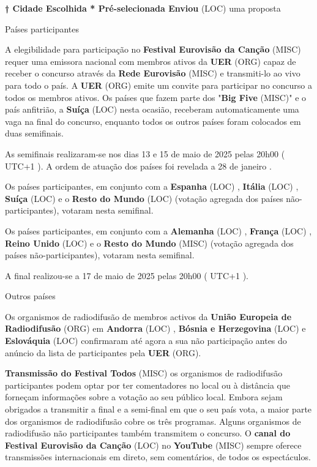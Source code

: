 \documentclass[12pt,a4paper]{article}
\begin{document}
\textbf{† Cidade Escolhida * Pré-selecionada  Enviou} (LOC) uma proposta



Países participantes

A elegibilidade para participação no \textbf{Festival Eurovisão da Canção} (MISC) requer uma emissora nacional com membros ativos da \textbf{UER} (ORG) capaz de receber o concurso através da \textbf{Rede Eurovisão} (MISC) e transmiti-lo ao vivo para todo o país. A \textbf{UER} (ORG) emite um convite para participar no concurso a todos os membros ativos. Os países que fazem parte dos "\textbf{Big Five} (MISC)" e o país anfitrião, a \textbf{Suíça} (LOC) nesta ocasião, receberam automaticamente uma vaga na final do concurso, enquanto todos os outros países foram colocados em duas semifinais.

As semifinais realizaram-se nos dias 13 e 15 de maio de 2025 pelas 20h00 ( UTC+1 ). A ordem de atuação dos países foi revelada a 28 de janeiro .

Os países participantes, em conjunto com a \textbf{Espanha} (LOC) , \textbf{Itália} (LOC) , \textbf{Suíça} (LOC) e o \textbf{Resto do Mundo} (LOC) (votação agregada dos países não-participantes), votaram nesta semifinal.

Os países participantes, em conjunto com a \textbf{Alemanha} (LOC) , \textbf{França} (LOC) , \textbf{Reino Unido} (LOC) e o \textbf{Resto do Mundo} (MISC) (votação agregada dos países não-participantes), votaram nesta semifinal.

A final realizou-se a 17 de maio de 2025 pelas 20h00 ( UTC+1 ).



Outros países

Os organismos de radiodifusão de membros activos da \textbf{União Europeia de Radiodifusão} (ORG) em \textbf{Andorra} (LOC) , \textbf{Bósnia e Herzegovina} (LOC) e \textbf{Eslováquia} (LOC) confirmaram até agora a sua não participação antes do anúncio da lista de participantes pela \textbf{UER} (ORG).



\textbf{Transmissão do Festival Todos} (MISC) os organismos de radiodifusão participantes podem optar por ter comentadores no local ou à distância que forneçam informações sobre a votação ao seu público local. Embora sejam obrigados a transmitir a final e a semi-final em que o seu país vota, a maior parte dos organismos de radiodifusão cobre os três programas. Alguns organismos de radiodifusão não participantes também transmitem o concurso. O \textbf{canal do Festival Eurovisão da Canção} (LOC) no \textbf{YouTube} (MISC) sempre oferece transmissões internacionais em direto, sem comentários, de todos os espectáculos.
\end{document}
